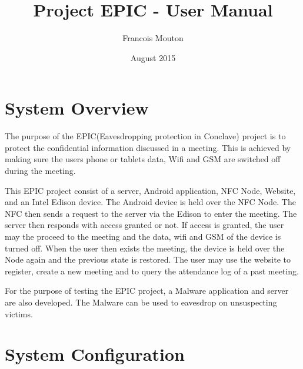 \documentclass{article}
\title{Project EPIC - User Manual}
\author{Francois Mouton}
\date{August 2015}
\begin{document}

\tableofcontents



\newpage
\section{System Overview}
The purpose of the EPIC(Eavesdropping protection in Conclave) project is to protect the confidential information discussed in a meeting. This is achieved by making sure the users phone or tablets data, Wifi and GSM are switched off during the meeting.

This EPIC project consist of a server, Android application, NFC Node, Website, and an Intel Edison device. 
The Android device is held over the NFC Node. The NFC then sends a request to the server via the Edison to enter the meeting. The server then responds with access granted or not. If access is granted, the user may the proceed to the meeting and the data, wifi and GSM of the device is turned off. When the user then exists the meeting, the device is held over the Node again and the previous state is restored. 
The user may use the website to register, create a new meeting and to query the attendance log of a past meeting.

For the purpose of testing the EPIC project, a Malware application and server are also developed. The Malware can be used to eavesdrop on unsuspecting victims. 



\newpage
\section{System Configuration}
\end{document}
